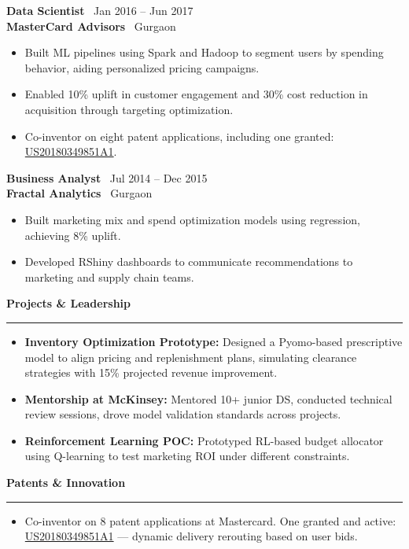 \documentclass[a4paper,10pt]{article}
\begin{document}
\noindent
\textbf{Data Scientist} \hfill \faCalendar \, Jan 2016 -- Jun 2017 \\
\textbf{MasterCard Advisors} \hfill \faMapMarker \, Gurgaon
\begin{itemize}[itemsep=1pt, topsep=0pt]
    \item Built ML pipelines using Spark and Hadoop to segment users by spending behavior, aiding personalized pricing campaigns.
    \item Enabled 10\% uplift in customer engagement and 30\% cost reduction in acquisition through targeting optimization.
    \item Co-inventor on eight patent applications, including one granted: \href{https://patents.google.com/patent/US20180349851A1/en?inventor=Ajay+Nehra}{US20180349851A1}.
\end{itemize}

\noindent
\textbf{Business Analyst} \hfill \faCalendar \, Jul 2014 -- Dec 2015 \\
\textbf{Fractal Analytics} \hfill \faMapMarker \, Gurgaon
\begin{itemize}[itemsep=1pt, topsep=0pt]
    \item Built marketing mix and spend optimization models using regression, achieving 8\% uplift.
    \item Developed RShiny dashboards to communicate recommendations to marketing and supply chain teams.
\end{itemize}

\vspace{2mm}
\textbf{\large Projects \& Leadership} \\
\rule{\textwidth}{0.8pt}
\begin{itemize}[itemsep=1pt, topsep=0pt]
    \item \textbf{Inventory Optimization Prototype:} Designed a Pyomo-based prescriptive model to align pricing and replenishment plans, simulating clearance strategies with 15\% projected revenue improvement.
    \item \textbf{Mentorship at McKinsey:} Mentored 10+ junior DS, conducted technical review sessions, drove model validation standards across projects.
    \item \textbf{Reinforcement Learning POC:} Prototyped RL-based budget allocator using Q-learning to test marketing ROI under different constraints.
\end{itemize}

\vspace{2mm}
\textbf{\large Patents \& Innovation} \\
\rule{\textwidth}{0.8pt}
\begin{itemize}[itemsep=1pt, topsep=0pt]
    \item Co-inventor on 8 patent applications at Mastercard. One granted and active: \href{https://patents.google.com/patent/US20180349851A1/en?inventor=Ajay+Nehra}{US20180349851A1} — dynamic delivery rerouting based on user bids.
\end{itemize}
\end{document}
